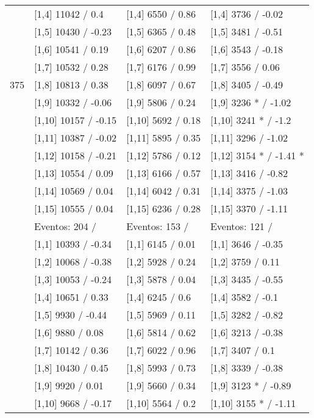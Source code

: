\begin{table}
\begin{tabular}[t]{llll}
\addlinespace
 & {}[1,4] 11042  / 0.4 & {}[1,4] 6550  / 0.86 & {}[1,4] 3736  / -0.02\\
 & {}[1,5] 10430  / -0.23 & {}[1,5] 6365  / 0.48 & {}[1,5] 3481  / -0.51\\
 & {}[1,6] 10541  / 0.19 & {}[1,6] 6207  / 0.86 & {}[1,6] 3543  / -0.18\\
 & {}[1,7] 10532  / 0.28 & {}[1,7] 6176  / 0.99 & {}[1,7] 3556  / 0.06\\
375 & {}[1,8] 10813  / 0.38 & {}[1,8] 6097  / 0.67 & {}[1,8] 3405  / -0.49\\
\addlinespace
 & {}[1,9] 10332  / -0.06 & {}[1,9] 5806  / 0.24 & {}[1,9] 3236 * / -1.02\\
 & {}[1,10] 10157  / -0.15 & {}[1,10] 5692  / 0.18 & {}[1,10] 3241 * / -1.2\\
 & {}[1,11] 10387  / -0.02 & {}[1,11] 5895  / 0.35 & {}[1,11] 3296  / -1.02\\
 & {}[1,12] 10158  / -0.21 & {}[1,12] 5786  / 0.12 & {}[1,12] 3154 * / -1.41 *\\
 & {}[1,13] 10554  / 0.09 & {}[1,13] 6166  / 0.57 & {}[1,13] 3416  / -0.82\\
\addlinespace
 & {}[1,14] 10569  / 0.04 & {}[1,14] 6042  / 0.31 & {}[1,14] 3375  / -1.03\\
 & {}[1,15] 10555  / 0.04 & {}[1,15] 6236  / 0.28 & {}[1,15] 3370  / -1.11\\
 & Eventos:  204 / & Eventos:  153 / & Eventos:  121 /\\
 & {}[1,1] 10393  / -0.34 & {}[1,1] 6145  / 0.01 & {}[1,1] 3646  / -0.35\\
 & {}[1,2] 10068  / -0.38 & {}[1,2] 5928  / 0.24 & {}[1,2] 3759  / 0.11\\
\addlinespace
 & {}[1,3] 10053  / -0.24 & {}[1,3] 5878  / 0.04 & {}[1,3] 3435  / -0.55\\
 & {}[1,4] 10651  / 0.33 & {}[1,4] 6245  / 0.6 & {}[1,4] 3582  / -0.1\\
 & {}[1,5] 9930  / -0.44 & {}[1,5] 5969  / 0.11 & {}[1,5] 3282  / -0.82\\
 & {}[1,6] 9880  / 0.08 & {}[1,6] 5814  / 0.62 & {}[1,6] 3213  / -0.38\\
 & {}[1,7] 10142  / 0.36 & {}[1,7] 6022  / 0.96 & {}[1,7] 3407  / 0.1\\
\addlinespace
500 & {}[1,8] 10430  / 0.45 & {}[1,8] 5993  / 0.73 & {}[1,8] 3339  / -0.38\\
 & {}[1,9] 9920  / 0.01 & {}[1,9] 5660  / 0.34 & {}[1,9] 3123 * / -0.89\\
 & {}[1,10] 9668  / -0.17 & {}[1,10] 5564  / 0.2 & {}[1,10] 3155 * / -1.11\\

\end{tabular}
\end{table}
